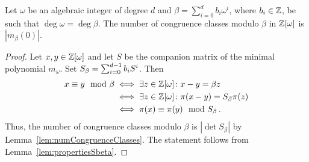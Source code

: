 \begin{thm}
Let $\omega$ be an algebraic integer of degree $d$ and  $\beta=\sum_{i=0}^d b_i \omega^i$, where $b_i\in\mathbb{Z}$, be such that $\deg \omega = \deg\beta$. The number of congruence classes modulo $\beta$ in $\mathbb{Z}[\omega]$ is $|m_\beta(0)|$.
\label{thm:numbCongruenceClasses}
\end{thm}
\begin{proof}
Let $x, y\in\mathbb{Z}[\omega]$ and let $S$ be the companion matrix of the minimal polynomial $m_\omega$. Set $S_\beta=\sum_{i=0}^{d-1} {b}_i S^i$. Then
\begin{align*}
x\equiv y \mod \beta &\iff \exists z \in \mathbb{Z}[\omega] \colon x-y= \beta z \\
&\iff \exists z \in \mathbb{Z}[\omega] \colon \pi(x-y)= S_\beta \pi(z) \\
&\iff \pi(x) \equiv \pi(y) \mod S_\beta\,.
\end{align*}
Thus, the number of congruence classes modulo $\beta$ is $|\det S_\beta|$ by Lemma~\ref{lem:numCongruenceClasses}. The statement follows from Lemma~\ref{lem:propertiesSbeta}. 
\end{proof}